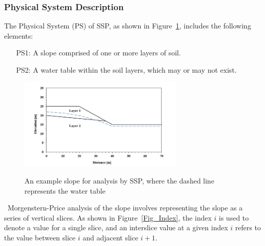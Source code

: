 \documentclass[12pt]{article}
\newcommand{\progname}{SSP}
\begin{document}
\subsubsection{Physical System Description} \label{sec_system}

The Physical System (PS) of \progname{}, as shown in Figure~\ref{Fig_PhysSyst}, 
includes the following elements:

\begin{itemize}
\item[PS1:] A slope comprised of one or more layers of soil.
\item[PS2:] A water table within the soil layers, which may or may not exist.
\end{itemize}

\begin{figure}[h!]
	\begin{center}
		{
			\includegraphics[width=0.7\textwidth]{PhysSyst.png}
		}
		\caption{An example slope for analysis by \progname{}, where the dashed 
		line represents the water table}
		\label{Fig_PhysSyst}
	\end{center}
\end{figure}

~\newline\noindent Morgenstern-Price \citep{MorgPrice} analysis of the slope 
involves representing the slope as a series of vertical slices. As shown in 
Figure~\ref{Fig_Index}, the index $i$ is used to denote a value for a single 
slice, and an interslice value at a given index $i$ refers to the value between 
slice $i$ and adjacent slice $\textit{i}+1$.
\end{document}
